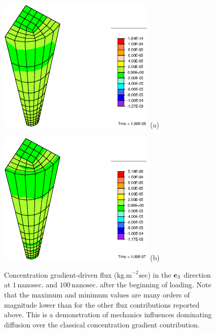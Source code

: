 \begin{figure}[!hpt]
\begin{minipage}[t]{7.5cm}
{\includegraphics[width=7.5cm]{images/examples/lagrangian/preliminary/M5-1}} \hskip 3cm (a)
\end{minipage}
\begin{minipage}[t]{7.5cm}
{\includegraphics[width=7.5cm]{images/examples/lagrangian/preliminary/M5-100}} \hskip 3cm (b)
\end{minipage}
\caption{Concentration gradient-driven flux
($\mathrm{kg.m}^{-2}\mathrm{sec}$) in the $\mbox{\boldmath$ e$}_3$ direction at $1
\,\mathrm{nanosec.}$ and $100\,\mathrm{nanosec.}$ after the
beginning of loading. Note that the maximum and minimum values are
many orders of magnitude lower than for the other flux
contributions reported above. This is a demonstration of mechanics
influences dominating diffusion over the classical concentration
gradient contribution.} \label{M5fig}
\end{figure}

